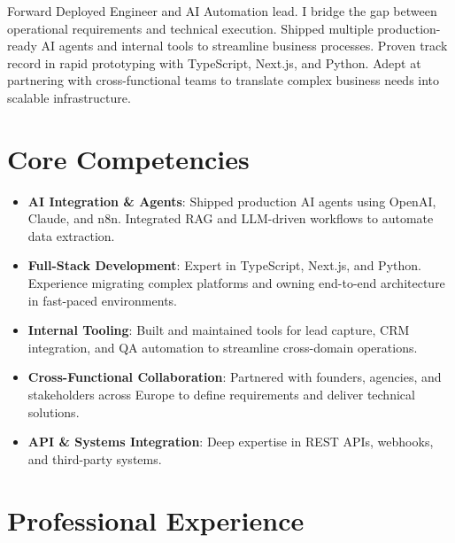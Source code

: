 \documentclass[11pt,a4paper,sans]{moderncv}
\begin{document}
\makecvtitle

Forward Deployed Engineer and AI Automation lead. I bridge the gap between operational requirements and technical execution. Shipped multiple production-ready AI agents and internal tools to streamline business processes. Proven track record in rapid prototyping with TypeScript, Next.js, and Python. Adept at partnering with cross-functional teams to translate complex business needs into scalable infrastructure.

\vspace{3pt}
\section{Core Competencies}
\begin{itemize}
\item \textbf{AI Integration \& Agents}: Shipped production AI agents using OpenAI, Claude, and n8n. Integrated RAG and LLM-driven workflows to automate data extraction.
\item \textbf{Full-Stack Development}: Expert in TypeScript, Next.js, and Python. Experience migrating complex platforms and owning end-to-end architecture in fast-paced environments.
\item \textbf{Internal Tooling}: Built and maintained tools for lead capture, CRM integration, and QA automation to streamline cross-domain operations.
\item \textbf{Cross-Functional Collaboration}: Partnered with founders, agencies, and stakeholders across Europe to define requirements and deliver technical solutions.
\item \textbf{API \& Systems Integration}: Deep expertise in REST APIs, webhooks, and third-party systems.
\end{itemize}

\vspace{3pt}
\section{Professional Experience}

\end{document}
